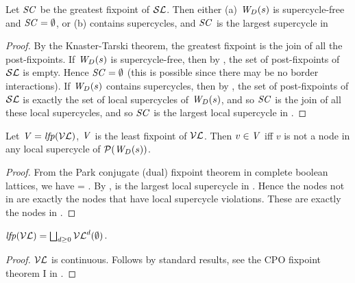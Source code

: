 \begin{proposition} \label{prop:GFPisLargestSCLoc}
Let $\SC$ be the greatest fixpoint of $\lSFs$. Then either
(a) $\lwfg{B}{s}{\DS}$  is supercycle-free and $\SC = \ewfg$, or 
(b)  contains supercycles, and $\SC$ is the largest supercycle in 
\end{proposition}
%
\begin{proof}
By the Knaster-Tarski theorem, the greatest fixpoint is the join of all the post-fixpoints. 
If $\lwfg{B}{s}{\DS}$ is supercycle-free, then by , the set of post-fixpoints of $\lSFs$ is empty. 
Hence $\SC = \ewfg$ (this is possible since there may be no border interactions). %
If $\lwfg{B}{s}{\DS}$ contains supercycles, then by ,  the set of post-fixpoints of $\lSFs$ is exactly the set of 
local supercycles of $\lwfg{B}{s}{\DS}$, and so $\SC$ is the join of all these local supercycles, and so $\SC$ is the largest local supercycle in .
\end{proof}



\begin{proposition} \label{prop:LFPisLocScViolations}
Let  $\VS= \lfp{\lVFs}$, \ie $\VS$ is the least fixpoint of $\lVFs$. Then $v \in \VS$ iff 
$v$ is not a node in any local supercycle of $\lwfgS{B}{s}{\DS}$.
\end{proposition}
%
\begin{proof}
From the Park conjugate (dual) fixpoint theorem in complete boolean lattices, we have 
\lfp{\VFs} = \compl{\gfp{\SFs}}.
By  , \gfp{\SFs} is the largest local supercycle in . Hence the nodes not in 
\gfp{\SFs} are exactly the nodes that have local supercycle violations. These are exactly the nodes in \lfp{\VFs}.
\end{proof}



\begin{proposition} \label{prop:computeLocLFP}
$\lfp{\lVFs} = \JOIN_{d \ge 0} \lVFs^{d} (\ewfg)$.
\end{proposition}
%
\begin{proof}
$\lVFs$ is continuous. Follows by standard results, \eg see the CPO fixpoint theorem I in 
\cite{DP02}.
\end{proof}







